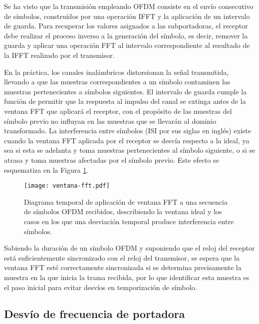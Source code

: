 Se ha visto que la transmisión empleando OFDM consiste en el envío consecutivo de símbolos, construídos por una operación IFFT y la aplicación de un intervalo de guarda. Para recuperar los valores asignados a las subportadoras, el receptor debe realizar el proceso inverso a la generación del símbolo, es decir, remover la guarda y aplicar una operación FFT al intervalo correspondiente al resultado de la IFFT realizado por el transmisor.

En la práctica, los canales inalámbricos distorsionan la señal transmitida, llevando a que las muestras correspondientes a un símbolo contaminen las muestras pertenecientes a símbolos siguientes. El intervalo de guarda cumple la función de permitir que la respuesta al impulso del canal se extinga antes de la ventana FFT que aplicará el receptor, con el propósito de las muestras del símbolo previo no influyan en las muestras que se llevarán al dominio transformado. La interferencia entre símbolos (ISI por sus siglas en inglés) existe cuando la ventana FFT aplicada por el receptor se desvía respecto a la ideal, ya sea si esta se adelanta y toma muestras pertenecientes al símbolo siguiente, o si se atrasa y toma muestras afectadas por el símbolo previo. Este efecto se esquematiza en la Figura \ref{fig:ventana-fft}.
\begin{figure}[t]
    \centering{}\texttt{[image: ventana-fft.pdf]}
    \caption{Diagrama temporal de aplicación de ventana FFT a una secuencia de símbolos OFDM recibidos, describiendo la ventana ideal y los casos en los que una desviación temporal produce interferencia entre símbolos.\label{fig:ventana-fft}}  
\end{figure}

Sabiendo la duración de un símbolo OFDM y suponiendo que el reloj del receptor está suficientemente sincronizado con el reloj del transmisor, se espera que la ventana FFT esté correctamente sincronizada si se determina precisamente la muestra en la que inicia la trama recibida, por lo que identificar esta muestra es el paso inicial para evitar desvíos en temporización de símbolo.

\subsection{Desvío de frecuencia de portadora}
\label{Ss:ch3-sincronismo-frecuencia}

